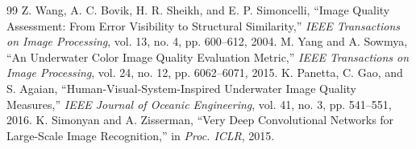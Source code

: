 \documentclass[final,1p,times]{elsarticle}
\begin{document}
\begin{thebibliography}{99}
 Z. Wang, A. C. Bovik, H. R. Sheikh, and E. P. Simoncelli, ``Image Quality Assessment: From Error Visibility to Structural Similarity,'' \emph{IEEE Transactions on Image Processing}, vol. 13, no. 4, pp. 600--612, 2004.
 M. Yang and A. Sowmya, ``An Underwater Color Image Quality Evaluation Metric,'' \emph{IEEE Transactions on Image Processing}, vol. 24, no. 12, pp. 6062--6071, 2015.
 K. Panetta, C. Gao, and S. Agaian, ``Human-Visual-System-Inspired Underwater Image Quality Measures,'' \emph{IEEE Journal of Oceanic Engineering}, vol. 41, no. 3, pp. 541--551, 2016.
 K. Simonyan and A. Zisserman, ``Very Deep Convolutional Networks for Large-Scale Image Recognition,'' in \emph{Proc. ICLR}, 2015.
\end{thebibliography}
\end{document}
